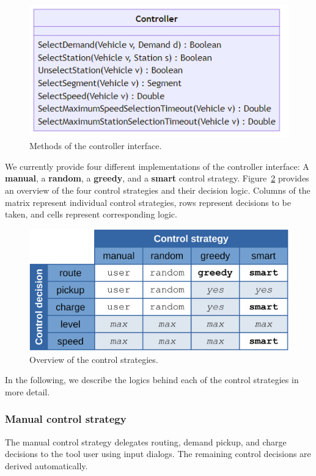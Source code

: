 \documentclass[a4paper,twoside]{article}
\begin{document}
	\begin{figure}[!ht]
		\centering
		\includegraphics[scale=0.3]{./graphics/interfaces/controller.png}
		\caption{Methods of the controller interface.}
		\label{fig:controller-interface}
	\end{figure}
	
	We currently provide four different implementations of the controller interface: A \textbf{manual}, a \textbf{random}, a \textbf{greedy}, and a \textbf{smart} control strategy.
	Figure~\ref{fig:control-strategies} provides an overview of the four control strategies and their decision logic.
	Columns of the matrix represent individual control strategies, rows represent decisions to be taken, and cells represent corresponding logic.
	
	\begin{figure}[!ht]
		\centering
		\includegraphics[width=0.65\columnwidth]{./graphics/control_strategy_overview.png}
		\caption{Overview of the control strategies.}
		\label{fig:control-strategies}
	\end{figure}
	
	In the following, we describe the logics behind each of the control strategies in more detail.
	
	\subsubsection*{Manual control strategy}
	\label{sec:controller-manual}
	
	The manual control strategy delegates routing, demand pickup, and charge decisions to the tool user using input dialogs.
	The remaining control decisions are derived automatically.
	
\end{document}
